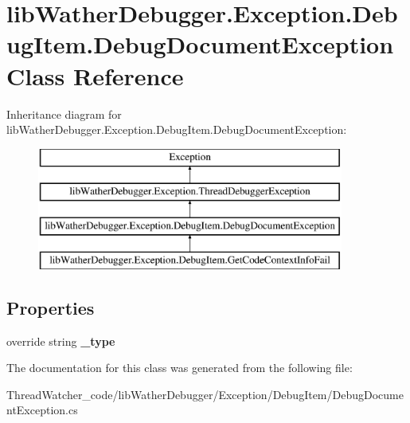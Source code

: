 \hypertarget{classlib_wather_debugger_1_1_exception_1_1_debug_item_1_1_debug_document_exception}{\section{lib\+Wather\+Debugger.\+Exception.\+Debug\+Item.\+Debug\+Document\+Exception Class Reference}
\label{classlib_wather_debugger_1_1_exception_1_1_debug_item_1_1_debug_document_exception}
}
Inheritance diagram for lib\+Wather\+Debugger.\+Exception.\+Debug\+Item.\+Debug\+Document\+Exception\+:\begin{figure}[H]
\begin{center}
\leavevmode
\includegraphics[height=4.000000cm]{classlib_wather_debugger_1_1_exception_1_1_debug_item_1_1_debug_document_exception}
\end{center}
\end{figure}
\subsection*{Properties}
\begin{DoxyCompactItemize}
\item 
\hypertarget{classlib_wather_debugger_1_1_exception_1_1_debug_item_1_1_debug_document_exception_a1a25b96385df126b3df267295adef8af}{override string {\bfseries \+\_\+type}}\label{classlib_wather_debugger_1_1_exception_1_1_debug_item_1_1_debug_document_exception_a1a25b96385df126b3df267295adef8af}

\end{DoxyCompactItemize}


The documentation for this class was generated from the following file\+:\begin{DoxyCompactItemize}
\item 
Thread\+Watcher\+\_\+code/lib\+Wather\+Debugger/\+Exception/\+Debug\+Item/Debug\+Document\+Exception.\+cs\end{DoxyCompactItemize}

